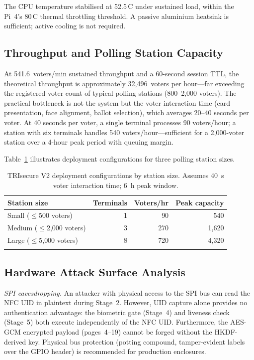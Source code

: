 \documentclass[pdflatex,sn-mathphys-num]{sn-jnl}%
\theoremstyle{thmstyleone}%
\theoremstyle{thmstyletwo}%
\theoremstyle{thmstylethree}%
\begin{document}
The CPU temperature stabilised at 52.5\,\textdegree{}C under sustained load,
within the Pi~4's 80\,\textdegree{}C thermal throttling threshold. A passive
aluminium heatsink is sufficient; active cooling is not required.

\subsection{Throughput and Polling Station Capacity}\label{sec:throughput}

At 541.6~voters/min sustained throughput and a 60-second session TTL, the
theoretical throughput is approximately 32{,}496~voters per hour---far
exceeding the registered voter count of typical polling stations
(800--2{,}000 voters). The practical bottleneck is not the system but the
voter interaction time (card presentation, face alignment, ballot selection),
which averages 20--40 seconds per voter. At 40 seconds per voter, a single
terminal processes 90 voters/hour; a station with six terminals handles 540
voters/hour---sufficient for a 2{,}000-voter station over a 4-hour peak period
with queuing margin.

Table~\ref{tab:throughput_scenarios} illustrates deployment configurations for
three polling station sizes.

\begin{table}[t]
\caption{TRIsecure V2 deployment configurations by station size. Assumes
  40~s voter interaction time; 6~h peak window.}
\label{tab:throughput_scenarios}%
\begin{tabular}{@{}lrrr@{}}
  \toprule
  Station size & Terminals & Voters/hr & Peak capacity \\
  \midrule
  Small  ($\leq$500 voters)      & 1 & 90  & 540  \\
  Medium ($\leq$2{,}000 voters)  & 3 & 270 & 1{,}620 \\
  Large  ($\leq$5{,}000 voters)  & 8 & 720 & 4{,}320 \\
  \botrule
\end{tabular}
\end{table}

\subsection{Hardware Attack Surface Analysis}\label{sec:hw_attack}

\textit{SPI eavesdropping.} An attacker with physical access to the SPI bus can
read the NFC UID in plaintext during Stage~2. However, UID capture alone
provides no authentication advantage: the biometric gate (Stage~4) and
liveness check (Stage~5) both execute independently of the NFC UID.
Furthermore, the AES-GCM encrypted payload (pages~4--19) cannot be forged
without the HKDF-derived key. Physical bus protection (potting compound,
tamper-evident labels over the GPIO header) is recommended for production
enclosures.
\end{document}

